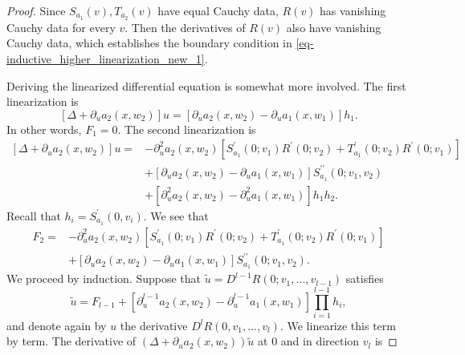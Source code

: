 \documentclass[11pt,a4paper]{amsart}
\theoremstyle{definition}
\numberwithin{equation}{section}
\begin{document}
\begin{proof}
Since \( S_{a_{1}}(v),T_{a_{2}}(v) \) have equal Cauchy data, \( R(v) \) has vanishing Cauchy data for every \( v \).
Then the derivatives of \( R(v) \) also have vanishing Cauchy data, which establishes the boundary condition in \eqref{eq-inductive_higher_linearization_new_1}.

Deriving the linearized differential equation is somewhat more involved.
The first linearization is
\begin{equation}\label{eq-inductive_higher_linearization_new_3}
	[\Delta+\partial_{u}a_{2}(x,w_{2})]u = [\partial_{u}a_{2}(x,w_{2})-\partial_{u}a_{1}(x,w_{1})]h_{1}.
\end{equation}
In other words, \( F_{1} = 0 \).
The second linearization is
\begin{equation*}
\begin{aligned}
	[\Delta+\partial_{u}a_{2}(x,w_{2})]u = &-\partial_{u}^{2}a_{2}(x,w_{2})[S_{a_{1}}^{\prime}(0;v_{1})R^{\prime}(0;v_{2}) + T_{a_{1}}^{\prime}(0;v_{2})R^{\prime}(0;v_{1})] \\
	&+[\partial_{u}a_{2}(x,w_{2})-\partial_{u}a_{1}(x,w_{1})]S_{a_{1}}^{\prime\prime}(0;v_{1},v_{2}) \\
	&+ [\partial_{u}^{2}a_{2}(x,w_{2})-\partial_{u}^{2}a_{1}(x,w_{1})]h_{1}h_{2}.
\end{aligned}
\end{equation*}
Recall that \( h_{i} = S_{a_{1}}^{\prime}(0,v_{i}) \).
We see that
\begin{equation*}
\begin{aligned}
	F_{2} = &-\partial_{u}^{2}a_{2}(x,w_{2})[S_{a_{1}}^{\prime}(0;v_{1})R^{\prime}(0;v_{2}) + T_{a_{1}}^{\prime}(0;v_{2})R^{\prime}(0;v_{1})] \\
	&+[\partial_{u}a_{2}(x,w_{2})-\partial_{u}a_{1}(x,w_{1})]S_{a_{1}}^{\prime\prime}(0;v_{1},v_{2}).
\end{aligned}
\end{equation*}
We proceed by induction.
Suppose that \( \tilde{u} = D^{l-1}R(0;v_{1},\ldots,v_{l-1}) \) satisfies
\begin{equation*}
	[\Delta + \partial_{u}a_{2}(x,w_{2})]\tilde{u} = F_{l-1} + [\partial_{u}^{l-1}a_{2}(x,w_{2})-\partial_{u}^{l-1}a_{1}(x,w_{1})]\prod_{i=1}^{l-1}h_{i},
\end{equation*}
and denote again by \( u \) the derivative \( D^{l}R(0,v_{1},\ldots,v_{l}) \).
We linearize this term by term.
The derivative of \( (\Delta+\partial_{u}a_{2}(x,w_{2}))\tilde{u} \) at \( 0 \) and in direction \( v_{l} \) is

\end{proof}
\end{document}
